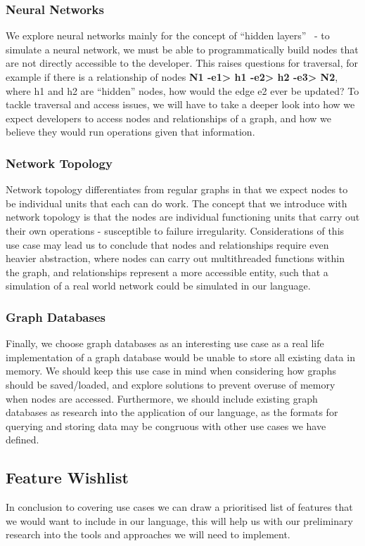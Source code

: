 \subsubsection{Neural Networks}
We explore neural networks mainly for the concept of ``hidden layers''~\cite{NNetHiddenLayers} - to simulate a neural
network, we must be able to programmatically build nodes that are not directly accessible to the developer.
This raises questions for traversal, for example if there is a relationship of nodes
\textbf{N1 -e1> h1 -e2> h2 -e3> N2}, where h1 and h2 are ``hidden'' nodes, how would the edge e2 ever be updated?
To tackle traversal and access issues, we will have to take a deeper look into how we expect developers to access nodes
and relationships of a graph, and how we believe they would run operations given that information.

\subsubsection{Network Topology}
Network topology differentiates from regular graphs in that we expect nodes to be individual units that each can do
work.
The concept that we introduce with network topology is that the nodes are individual functioning units that carry out
their own operations - susceptible to failure irregularity.
Considerations of this use case may lead us to conclude that nodes and relationships require even heavier abstraction,
where nodes can carry out multithreaded functions within the graph, and relationships represent a more accessible
entity, such that a simulation of a real world network could be simulated in our language.

\subsubsection{Graph Databases}
Finally, we choose graph databases as an interesting use case as a real life implementation of a graph database would be
unable to store all existing data in memory.
We should keep this use case in mind when considering how graphs should be saved/loaded, and explore solutions to
prevent overuse of memory when nodes are accessed.
Furthermore, we should include existing graph databases as research into the application of our language, as the formats
for querying and storing data may be congruous with other use cases we have defined.

\subsection{Feature Wishlist}\label{subsec:feature-wishlist}
In conclusion to covering use cases we can draw a prioritised list of features that we would want to include in our
language, this will help us with our preliminary research into the tools and approaches we will need to implement.

